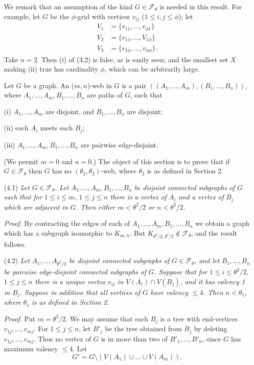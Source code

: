 We remark that an assumption of the kind $G \in \mathcal{F}_\theta$ is needed in this result. For example, let $G$ be the $\phi$-grid with vertices $v_{ij}$ ($1 \le i, j \le \phi$); let
\begin{align*}
V_1 &= \{v_{11}, \dots, v_{\phi 1}\} \\
V_2 &= \{v_{11}, \dots, V_{1 \phi}\} \\
V_3 &= \{v_{1 \phi}, \dots, v_{\phi \phi}\}.
\end{align*}
Take $n = 2$. Then (i) of (3.2) is false, as is easily seen; and the smallest set $X$ making (ii) true has cardinality $\phi$, which can be arbitrarily large.


Let $G$ be a graph. An ($m, n$)-web in $G$ is a pair $((A_1, \dots, A_m), (B_1, \dots, B_n))$, where $A_1, \dots, A_m, B_1, \dots, B_n$ are paths of $G$, such that

\hspace*{12pt}(i) $A_1, \dots, A_m$ are disjoint, and $B_1, \dots, B_n$ are disjoint;

\hspace*{12pt}(ii) each $A_i$ meets each $B_j$;

\hspace*{12pt}(iii) $A_1, \dots, A_m, B_1, \dots, B_n$ are pairwise edge-disjoint.

(We permit $m = 0$ and $n = 0$.) The object of this section is to prove that if $G \in \mathcal{F}_\theta$ then $G$ has no $(\theta_2, \theta_2)$-web, where $\theta_2$ is as defined in Section 2.

\stmt
(4.1) \textit{Let $G \in \mathcal{F}_\theta$. Let $A_1, \dots, A_m, B_1, \dots, B_n$ be disjoint connected subgraphs of $G$ such that for $1 \le i \le m$, $1 \le j \le n$ there is a vertex of $A_i$ and a vertex of $B_j$ which are adjacent in $G$. Then either $m < \theta^2/2$ or $n < \theta^2/2$.}

\textit{Proof.} By contracting the edges of each of $A_1, \dots, A_m, B_1, \dots, B_n$ we obtain a graph which has a subgraph isomorphic to $K_{m, n}$. But $K_{\theta^2/2, \theta^2/2} \notin \mathcal{F}_\theta$, and the result follows.

\stmt
(4.2) \textit{Let $A_1, \dots, A_{\theta^2/2}$ be disjoint connected subgraphs of $G \in \mathcal{F}_\theta$, and let $B_1, \dots, B_n$ be pairwise edge-disjoint connected subgraphs of $G$. Suppose that for $1 \le i \le \theta^2/2$, $1 \le j \le n$ there is a unique vertex $v_{ij}$ in $V(A_i) \cap V(B_j)$, and it has valency 1 in $B_j$. Suppose in addition that all vertices of $G$ have valency $\le 4$. Then $n < \theta_1$, where $\theta_1$ is as defined in Section 2.}

\textit{Proof.} Put $m = \theta^2/2$. We may assume that each $B_j$ is a tree with end-vertices $v_{1j}, \dots, v_{mj}$. For $1 \le j \le n$, let $B'_j$ be the tree obtained from $B_j$ by deleting $v_{1j}, \dots, v_{mj}$. Thus no vertex of $G$ is in more than two of $B'_1, \dots, B'_n$, since $G$ has maximum valency $\le 4$. Let
\begin{equation*}
G' = G \setminus (V(A_1) \cup \dots \cup V(A_m)).
\end{equation*}
